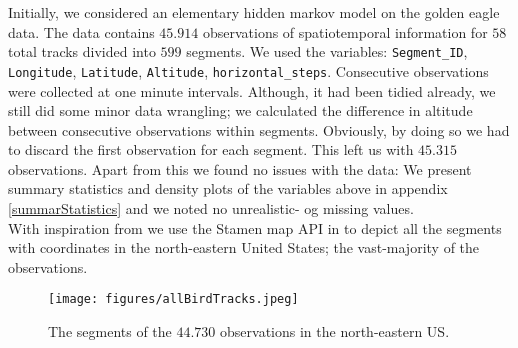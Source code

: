 Initially, we considered an elementary hidden markov model on the golden eagle data.\cite{eagleData} The data contains $45.914$ observations of spatiotemporal information for $58$ total tracks divided into $599$ segments. We used the variables: \texttt{Segment\_ID}, \texttt{Longitude}, \texttt{Latitude}, \texttt{Altitude}, \texttt{horizontal\_steps}. Consecutive observations were collected at one minute intervals. Although, it had been tidied already, we still did some minor data wrangling; we calculated the difference in altitude between consecutive observations within segments. Obviously, by doing so we had to discard the first observation for each segment. This left us with $45.315$ observations. Apart from this we found no issues with the data: We present summary statistics and density plots of the variables above in appendix \ref{summarStatistics} and we noted no unrealistic- og missing values.\\ With inspiration from \cite{Pirotta2018} we use the Stamen map API in \cite{ggmap} to depict all the segments with coordinates in the north-eastern United States; the vast-majority of the observations.
\begin{figure}[h]
    \begin{center}
        \texttt{[image: figures/allBirdTracks.jpeg]}
        \caption{The segments of the $44.730$ observations in the north-eastern US.}
    \end{center}
\end{figure}
